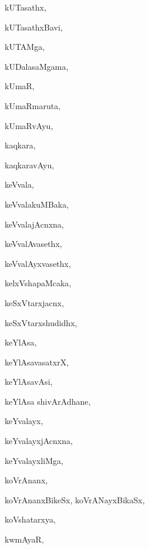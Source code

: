 \begin{multicols}{3}
{\noindent
{kUTasathx}, \pageref{kUTasathx}

\noindent
{kUTasathxBavi}, \pageref{kUTasathxBavi}

\noindent
{kUTAMga}, \pageref{kUTAMga}

\noindent
{kUDalasaMgama}, \pageref{kUDalasaMgama}

\noindent
{kUmaR}, \pageref{kUmaR}

\noindent
{kUmaRmaruta}, \pageref{kUmaRmaruta}

\noindent
{kUmaRvAyu}, \pageref{kUmaRvAyu}

\noindent
{kaqkara}, \pageref{kaqkara}

\noindent
{kaqkaravAyu}, \pageref{kaqkaravAyu}

\noindent
{keVvala}, \pageref{keVvala}

\noindent
{keVvalakuMBaka}, \pageref{keVvalakuMBaka}

\noindent
{keVvalajAcnxna}, \pageref{keVvalajAcnxna}

\noindent
{keVvalAvasethx}, \pageref{keVvalAvasethx}

\noindent
{keVvalAyxvasethx}, \pageref{keVvalAyxvasethx}

\noindent
{kelxVshapaMcaka}, \pageref{kelxVshapaMcaka}

\noindent
{keSxVtarxjacnx}, \pageref{keSxVtarxjacnx}

\noindent
{keSxVtarxshudidhx}, \pageref{keSxVtarxshudidhx}

\noindent
{keYlAsa}, \pageref{keYlAsa}

\noindent
{keYlAsavasatxrX}, \pageref{keYlAsavasatxrX}

\noindent
{keYlAsavAsi}, \pageref{keYlAsavAsi}

\noindent
{keYlAsa shivArAdhane}, \pageref{keYlAsa shivArAdhane}

\noindent
{keYvalayx}, \pageref{keYvalayx}

\noindent
{keYvalayxjAcnxna}, \pageref{keYvalayxjAcnxna}

\noindent
{keYvalayxliMga}, \pageref{keYvalayxliMga}

\noindent
{koVrAnanx}, \pageref{koVrAnanx}

\noindent
{koVrAnanxBikeSx, koVrANayxBikaSx}, \pageref{koVrAnanxBikeSx, koVrANayxBikaSx}

\noindent
{koVshatarxya}, \pageref{koVshatarxya}

\noindent
{kwmAyaR}, \pageref{kwmAyaR}

\bigskip
\noindent
{}
\smallskip

}
\end{multicols}
